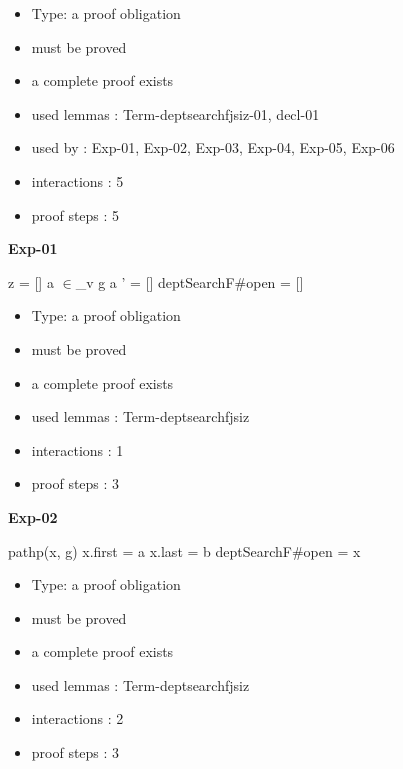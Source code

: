 \documentclass[a4paper]{article}
\begin{document}
\begin{itemize}

\item Type: a proof obligation

\item       must be proved
\item       a complete proof exists
\item       used lemmas  : Term-deptsearchfjsiz-01, decl-01
\item       used by      : Exp-01, Exp-02, Exp-03, Exp-04, Exp-05, Exp-06
\item       interactions : 5
\item       proof steps  : 5
\end{itemize}

\medskip

{\LARGE\bf Exp-01}\label{lemma-Exp-01}

\medskip

 \Fol z = [] \And a $\in$\_v g \Or a ' = [] \Imp \Do deptSearchF\#\Dc open = []

\begin{itemize}

\item Type: a proof obligation

\item       must be proved
\item       a complete proof exists
\item       used lemmas  : Term-deptsearchfjsiz
\item       interactions : 1
\item       proof steps  : 3
\end{itemize}

\medskip

{\LARGE\bf Exp-02}\label{lemma-Exp-02}

\medskip

 \Fol pathp(x, g) \And x.first = a \And x.last = b \Imp \Do deptSearchF\#\Dc open = x

\begin{itemize}

\item Type: a proof obligation

\item       must be proved
\item       a complete proof exists
\item       used lemmas  : Term-deptsearchfjsiz
\item       interactions : 2
\item       proof steps  : 3
\end{itemize}
\end{document}
